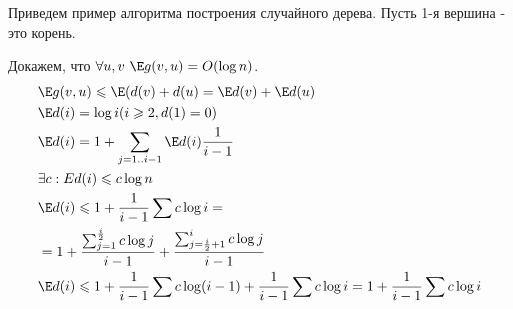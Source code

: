 \begin{example}
    Приведем пример алгоритма построения случайного дерева. Пусть 1-я вершина - это корень. \par

  \begin{algorithm}
    \begin{algorithmic}
        \EndIf
      \EndFor
    \end{algorithmic}
  \end{algorithm}
  
    Докажем, что $\forall u,v \ \E g(v,u)=O(\log n)$.
    \begin{align*}
        & \E g(v,u) \leqslant \E(d(v) + d(u) = \E d(v) + \E d(u) \\
        & \E d(i)=\log i (i \geqslant{2},d(1)=0) \\
        & \E d(i)=1+\sum_{j=1..i-1} \E d(i) \frac{1}{i-1} \\
        & \exists c: Ed(i) \leqslant{c \log n} \\
        & \E d(i) \leqslant{ 1+ \frac{1}{i-1} \sum c \log i} = \\
        & = 1 + \frac{\sum_{j=1}^{\frac{i}{2}} c \log j}{i-1} + \frac{\sum_{j=\frac{i}{2}+1}^{i} c \log j}{i-1} \\
        & \E d(i) \leqslant{1+\frac{1}{i-1} \sum c\log (i-1) + \frac{1}{i-1} \sum c\log i} = 1 + \frac{1}{i-1} \sum c\log i
    \end{align*}
\end{example}